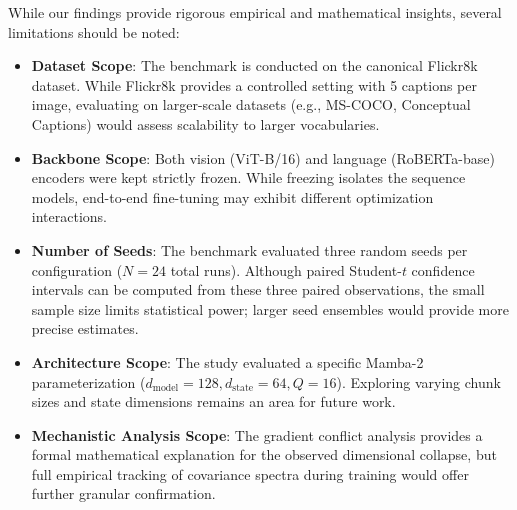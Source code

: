 \documentclass[10pt,journal,final]{IEEEtran}
\begin{document}
While our findings provide rigorous empirical and mathematical insights, several limitations should be noted:
\begin{itemize}
    \item \textbf{Dataset Scope}: The benchmark is conducted on the canonical Flickr8k dataset. While Flickr8k provides a controlled setting with 5 captions per image, evaluating on larger-scale datasets (e.g., MS-COCO, Conceptual Captions) would assess scalability to larger vocabularies.
    \item \textbf{Backbone Scope}: Both vision (ViT-B/16) and language (RoBERTa-base) encoders were kept strictly frozen. While freezing isolates the sequence models, end-to-end fine-tuning may exhibit different optimization interactions.
    \item \textbf{Number of Seeds}: The benchmark evaluated three random seeds per configuration ($N=24$ total runs). Although paired Student-$t$ confidence intervals can be computed from these three paired observations, the small sample size limits statistical power; larger seed ensembles would provide more precise estimates.
    \item \textbf{Architecture Scope}: The study evaluated a specific Mamba-2 parameterization ($d_{\mathrm{model}}=128, d_{\mathrm{state}}=64, Q=16$). Exploring varying chunk sizes and state dimensions remains an area for future work.
    \item \textbf{Mechanistic Analysis Scope}: The gradient conflict analysis provides a formal mathematical explanation for the observed dimensional collapse, but full empirical tracking of covariance spectra during training would offer further granular confirmation.
\end{itemize}

\end{document}
